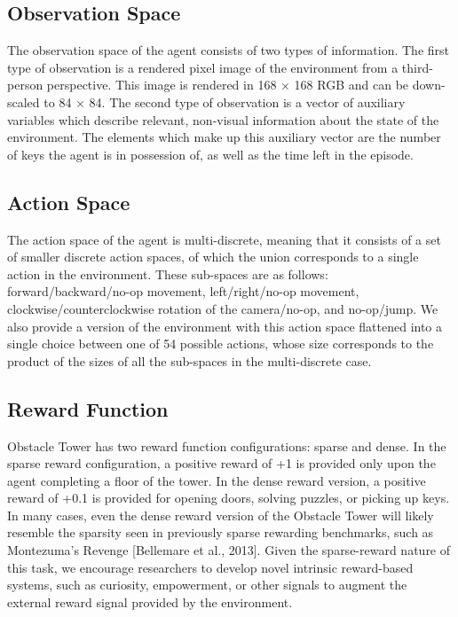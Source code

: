 \documentclass[conference]{IEEEtran}
\begin{document}
\subsection{\textbf{Observation Space}}
The observation space of the agent consists of two types of information. The first type of observation is a rendered pixel image of the environment from a third-person perspective.
This image is rendered in 168 × 168 RGB and can be down-scaled to 84 × 84. The second type of observation is a vector of auxiliary variables which describe relevant, non-visual information about the state of the environment. The elements which make up this auxiliary vector are the number of keys the agent is in possession of, as well as the time left in the episode.

\subsection{\textbf{Action Space}}
The action space of the agent is multi-discrete, meaning that it consists of a set of smaller discrete action spaces, of which the union corresponds to a single action in the environment. These sub-spaces are as follows: forward/backward/no-op movement, left/right/no-op movement, clockwise/counterclockwise rotation of the camera/no-op, and no-op/jump. We also provide a version of the environment with this action space flattened into a single choice between one of 54 possible actions, whose size corresponds to the product of the sizes of all the sub-spaces in the multi-discrete case.

\subsection{\textbf{Reward Function}}
Obstacle Tower has two reward function configurations: sparse and dense. In the sparse reward configuration, a positive reward of +1 is provided only upon the agent completing a floor of the tower. In the dense reward version, a positive reward of +0.1 is provided for opening doors, solving puzzles, or picking up keys. In many cases, even the dense reward version of the Obstacle Tower will likely resemble the sparsity seen in previously sparse rewarding benchmarks, such as Montezuma’s Revenge [Bellemare et al., 2013]. Given the sparse-reward nature of this task, we encourage researchers to develop novel intrinsic reward-based systems, such as curiosity, empowerment, or other signals to augment the external reward signal provided by the environment.
\end{document}
